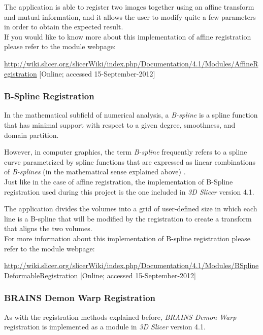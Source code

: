 The application is able to register two images together using an
affine transform and mutual information, and it allows the user to
modify quite a few parameters
in order to obtain the expected result.\\

If you would like to know more about this implementation of affine
registration please refer to the module webpage:

\url{http://wiki.slicer.org/slicerWiki/index.php/Documentation/4.1/Modules/AffineRegistration}
[Online; accessed 15-September-2012]

\subsubsection{B-Spline Registration}
In the mathematical subfield of numerical analysis, a
\textit{B-spline} is a spline function that has minimal support with
respect to a given degree, smoothness, and domain partition.

However, in computer graphics, the term \textit{B-spline} frequently
refers to a spline curve parametrized by spline functions that are
expressed as linear combinations of \textit{B-splines} (in the
mathematical sense explained above) \cite{bspline}.\\

Just like in the case of affine registration, the implementation of
B-Spline registration used during this project is the one included in
\textit{3D Slicer} version 4.1. 

The application divides the volumes into a grid of user-defined size
in which each line is a B-spline that will be modified by the
registration to create a transform that aligns the two volumes.\\

For more information about this implementation of B-spline
registration please refer to the module webpage:

\url{http://wiki.slicer.org/slicerWiki/index.php/Documentation/4.1/Modules/BSplineDeformableRegistration}
[Online; accessed 15-September-2012]

\subsubsection{BRAINS Demon Warp Registration}
\label{sec:demon_warp}
As with the registration methods explained before, \textit{BRAINS
  Demon Warp} registration is implemented as a module in \textit{3D
  Slicer} version 4.1.\\

